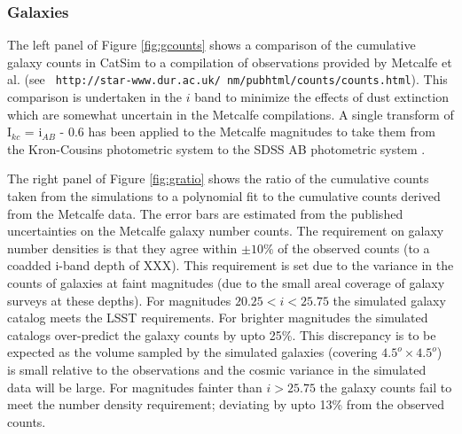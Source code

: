 \documentclass[]{article}
\begin{document}
\subsubsection{Galaxies \label{sec:galaxycounts}}

The left panel of Figure \ref{fig:gcounts} shows a comparison of the
cumulative galaxy counts in CatSim to a compilation of observations
provided by Metcalfe et al. (see {\tt
  http://star-www.dur.ac.uk/~nm/pubhtml/counts/counts.html}).  This
comparison is undertaken in the $i$ band to minimize the effects of
dust extinction which are somewhat uncertain in the Metcalfe
compilations.  A single transform of I$_{kc}$ = i$_{AB}$ - 0.6 has
been applied to the Metcalfe magnitudes to take them from the
Kron-Cousins photometric system to the SDSS AB photometric system \citep{ellis07}.

The right panel of Figure \ref{fig:gratio} shows the ratio of the
cumulative counts taken from the simulations to a polynomial fit to
the cumulative counts derived from the Metcalfe data.  The error bars
are estimated from the published uncertainties on the Metcalfe galaxy
number counts. The requirement on galaxy number densities is that they
agree within $\pm10\%$ of the observed counts (to a coadded i-band
depth of XXX). This requirement is set due to the variance in the
counts of galaxies at faint magnitudes (due to the small areal
coverage of galaxy surveys at these depths).  For magnitudes
$20.25<i<25.75$ the simulated galaxy catalog meets the LSST requirements.
For brighter magnitudes the simulated catalogs over-predict the galaxy
counts by upto 25\%. This discrepancy is to be expected as the volume
sampled by the simulated galaxies (covering $4.5^o \times 4.5^o$) is small
relative to the observations and the cosmic variance in the simulated
data will be large. For magnitudes fainter than $i>25.75$ the galaxy
counts fail to meet the number density requirement; deviating by upto 13\%
from the observed counts.

\end{document}
